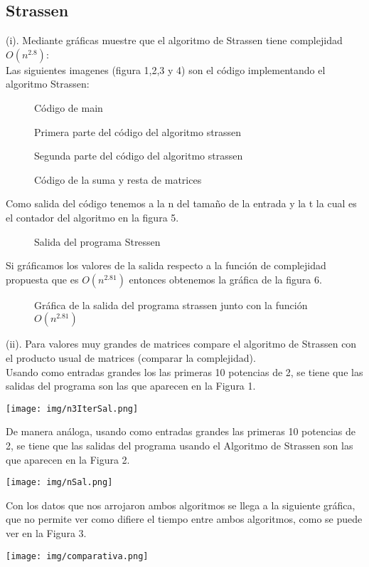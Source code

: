 \documentclass[a4paper]{article}
\newcommand{\addfigure}[4]{
        \begin{figure}[htbp!]
            \begin{center}	
                \fbox{\texttt{[image: \#2]}}
                \caption{#4}
                \label{#3}
            \end{center}
        \end{figure}
  }
\begin{document}
\subsection{Strassen}
(i). Mediante gráficas muestre que el algoritmo de Strassen tiene complejidad $O(n^{2.8})$: \\
	Las siguientes imagenes (figura 1,2,3 y 4) son el código implementando el algoritmo Strassen:\\
\addfigure{.5}{img/Codigo}{fig:man}{Código de main}
\addfigure{.7}{img/Codigo1}{fig:stra}{Primera parte del código del algoritmo strassen}
\addfigure{.7}{img/Codigo2}{fig:stra1}{Segunda parte del código del algoritmo strassen}
\addfigure{.7}{img/Codigo3}{fig:sumres}{Código de la suma y resta de matrices}
\clearpage
Como salida del código tenemos a la n del tamaño de la entrada y la t la cual es el contador del algoritmo en la figura 5.\\
\addfigure{.25}{img/SalidaStre}{fig:SM}{Salida del programa Stressen}
Si gráficamos los valores de la salida respecto a la función de complejidad propuesta que es $O(n^{2.81})$ entonces obtenemos la gráfica de la figura 6.\\
\addfigure{.7}{img/graficaPrac5}{fig:grafica}{Gráfica de la salida del programa strassen junto con la función $O(n^{2.81})$}

(ii). Para valores muy grandes de matrices compare el algoritmo de Strassen con el producto usual de matrices (comparar la complejidad).
\\
Usando como entradas grandes los las primeras 10 potencias de 2, se tiene que las salidas del programa son las que aparecen en la Figura 1. 
\\
\begin{center}
\texttt{[image: img/n3IterSal.png]}\end{center}

De manera análoga, usando como entradas grandes las primeras 10 potencias de 2, se tiene que las salidas del programa usando el Algoritmo de Strassen son las que aparecen en la Figura 2.\\
\begin{center}

\texttt{[image: img/nSal.png]}
\end{center}
Con los datos que nos arrojaron ambos algoritmos se llega a la siguiente gráfica, que no permite ver como difiere el tiempo entre ambos algoritmos, como se puede ver en la Figura 3.\\
\begin{center}
\texttt{[image: img/comparativa.png]}
\end{center}
\end{document}
